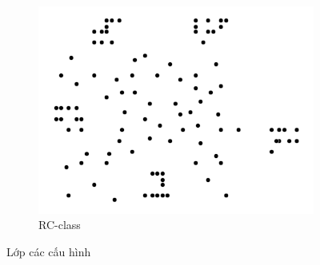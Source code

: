 \begin{figure}[H]
\begin{subfigure}{.3\textwidth}
		\includegraphics[width=1\linewidth]{figures/cls_rc.png}
		\caption{RC-class}
		\label{fig:cls_rc}
	\end{subfigure}
	\caption{Lớp các cấu hình}
\end{figure}

